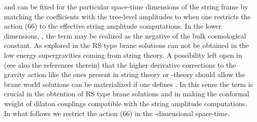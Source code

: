 \documentclass[a4paper,12pt]{article}
\begin{document}
\coordHE{} and \coordHE{} can be fixed for the particular space-time 
dimensions of the string frame by matching the coefficients with the 
tree-level amplitudes to \coordHE{} when one restricts the action 
(66) to the effective string amplitude computations. In the 
lower dimensions, \coordHE{}, the term \coordHE{} may be realized as the 
negative of the bulk cosmological constant. As explored in \cite{JMC} the 
RS type brane solutions can not be obtained in the low energy supergravities 
coming from string theory. A possibility left open in \cite{JMC} 
(see also the references therein) that the higher derivative corrections 
to the gravity action like the ones present in string theory or \coordHE{}-theory 
should allow the brane world solutions can be materialized if one defines 
\coordHE{}. In this sense the term \coordHE{} is 
crucial in the obtention of RS type brane solutions and in making 
the conformal weight of dilaton couplings compatible with the string 
amplitude computations. In what follows we 
restrict the action (66) in the \coordHE{}-dimensional space-time.       
 
\end{document}
